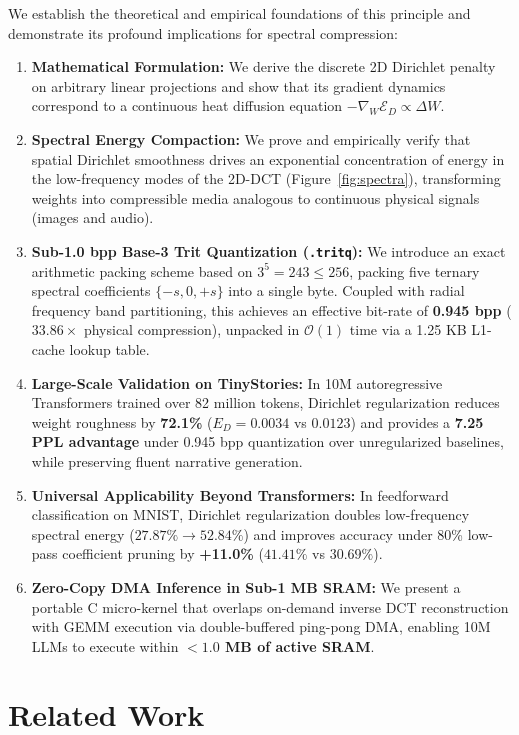 \documentclass[11pt,a4paper]{article}
\begin{document}
We establish the theoretical and empirical foundations of this principle and demonstrate its profound implications for spectral compression:
\begin{enumerate}
    \item \textbf{Mathematical Formulation:} We derive the discrete 2D Dirichlet penalty on arbitrary linear projections and show that its gradient dynamics correspond to a continuous heat diffusion equation $-\nabla_W \mathcal{E}_D \propto \Delta W$.
    \item \textbf{Spectral Energy Compaction:} We prove and empirically verify that spatial Dirichlet smoothness drives an exponential concentration of energy in the low-frequency modes of the 2D-DCT (Figure~\ref{fig:spectra}), transforming weights into compressible media analogous to continuous physical signals (images and audio).
    \item \textbf{Sub-1.0 bpp Base-3 Trit Quantization (\texttt{.tritq}):} We introduce an exact arithmetic packing scheme based on $3^5 = 243 \le 256$, packing five ternary spectral coefficients $\{-s, 0, +s\}$ into a single byte. Coupled with radial frequency band partitioning, this achieves an effective bit-rate of \textbf{0.945 bpp} ($33.86\times$ physical compression), unpacked in $\mathcal{O}(1)$ time via a 1.25 KB L1-cache lookup table.
    \item \textbf{Large-Scale Validation on TinyStories:} In 10M autoregressive Transformers trained over 82 million tokens, Dirichlet regularization reduces weight roughness by \textbf{72.1\%} ($E_D = 0.0034$ vs $0.0123$) and provides a \textbf{7.25 PPL advantage} under 0.945 bpp quantization over unregularized baselines, while preserving fluent narrative generation.
    \item \textbf{Universal Applicability Beyond Transformers:} In feedforward classification on MNIST, Dirichlet regularization doubles low-frequency spectral energy ($27.87\% \to 52.84\%$) and improves accuracy under 80\% low-pass coefficient pruning by \textbf{+11.0\%} ($41.41\%$ vs $30.69\%$).
    \item \textbf{Zero-Copy DMA Inference in Sub-1 MB SRAM:} We present a portable C micro-kernel that overlaps on-demand inverse DCT reconstruction with GEMM execution via double-buffered ping-pong DMA, enabling 10M LLMs to execute within \textbf{$<1.0$ MB of active SRAM}.
\end{enumerate}

\section{Related Work}
\label{sec:related}
\end{document}
